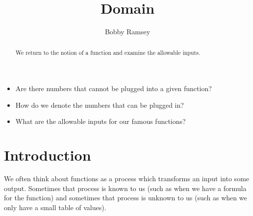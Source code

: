 \documentclass[nooutcomes]{ximera}
\author{Bobby Ramsey}
\title{Domain}
\begin{document}
\begin{abstract}
 	We return to the notion of a function and examine the allowable inputs.
\end{abstract}
\licenseORCCA
\maketitle



\begin{motivatingQuestions}\begin{itemize}
	\item Are there numbers that cannot be plugged into a given function?
	\item How do we denote the numbers that can be plugged in?
	\item What are the allowable inputs for our famous functions?
\end{itemize}\end{motivatingQuestions}

\section{Introduction}

	We often think about functions as a process which transforms an input into
	some output. Sometimes that process is known to us (such as when we have a formula for the function) and sometimes that process is unknown to us 
	(such as when we only have a small table of values). 
\end{document}
